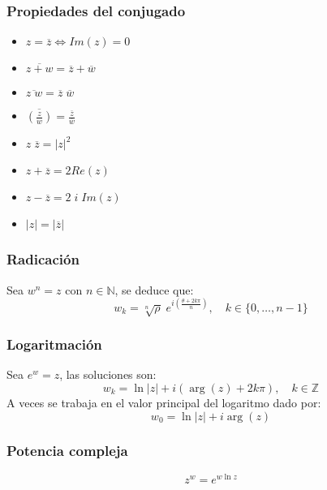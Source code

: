 \subsubsection*{Propiedades del conjugado}
\begin{itemize}
    \item \(z = \overline{z} \iff Im(z) = 0\)
    \item \(\overline{z+w} = \overline{z} + \overline{w}\)
    \item \(\overline{z \; w} = \overline{z} \; \overline{w}\)
    \item \(\overline{\left(\frac{z}{w} \right)} = \frac{\overline{z}}{\overline{w}}\)
    \item \(z \; \overline{z} = |z|^2\)
    \item \( z + \overline{z} = 2 Re(z) \)
    \item \(z - \overline{z} = 2 \; i \; Im(z)\)
    \item \(|z| = |\overline{z}|\)
\end{itemize}
\subsubsection*{Radicación}
Sea \(w^n = z\) con \(n \in \mathbb{N}\), se deduce que:
\[w_k = \sqrt[n]{\rho} \; e^{i \left(\frac{\theta + 2k \pi}{n}\right)}, \quad k \in \{0, \dots, n-1\}\]
\subsubsection*{Logaritmación}
Sea \(e^w = z\), las soluciones son:
\[w_k = \ln|z| + i (\arg(z) + 2k\pi), \quad k \in \mathbb{Z}\]
A veces se trabaja en el valor principal del logaritmo dado por:
\[w_0 = \ln|z| + i \arg(z)\]
\subsubsection*{Potencia compleja}
\[z^w = e^{w \ln z}\]